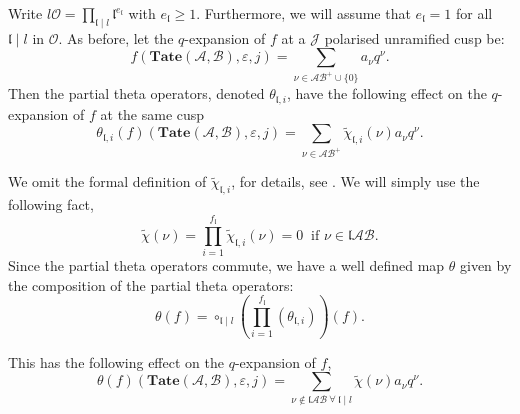 \documentclass[a4paper,oneside]{amsart}
\theoremstyle{plain}
\theoremstyle{definition}
\begin{document}
Write $l\mathcal{O}=\prod_{\mathfrak{l}\mid l} \mathfrak{l}^{e_{\mathfrak{l}}}$ with $e_\mathfrak{l} \geq 1$. Furthermore, we will assume that $e_\mathfrak{l}=1$ for all $\mathfrak{l} \mid l$ in $\mathcal{O}$. As before, let the $q$-expansion of $f$ at a $\mathcal{J}$ polarised unramified cusp be:
\begin{equation*}
    f(\textbf{Tate}(\mathcal{A}, \mathcal{B}), \varepsilon, j) = \sum_{\nu \in \mathcal{AB}^+\cup \{0\}} a_\nu q^\nu.
\end{equation*}
Then the partial theta operators, denoted $\theta_{\mathfrak{l},i}$, have the following effect on the $q$-expansion of $f$ at the same cusp
\begin{equation*}
    \theta_{\mathfrak{l},i}(f)(\textbf{Tate}(\mathcal{A}, \mathcal{B}), \varepsilon, j) = \sum_{\nu \in \mathcal{AB}^+} \tilde{\chi}_{\mathfrak{l},i}(\nu) a_\nu q^\nu.
\end{equation*}

We omit the formal definition of $\tilde{\chi}_{\mathfrak{l},i}$, for details, see \cite[\S 15]{andreattagoren}. We will simply use the following fact, 
\begin{equation*}
     \tilde{\chi}(\nu)=\prod_{i=1}^{f_{\mathfrak{l}}} \tilde{\chi}_{\mathfrak{l},i}(\nu) =  0 \ \text{ if } \nu \in \mathfrak{l}\mathcal{AB}.
\end{equation*}
Since the partial theta operators commute, we have a well defined map $\theta$ given by the composition of the partial theta operators:
\begin{equation} \label{eq:theta}
    \theta(f) = \circ_{\mathfrak{l} \mid l} \left(\prod_{i=1}^{f_\mathfrak{l}}  (\theta_{\mathfrak{l},i})\right)(f).
\end{equation}

This has the following effect on the $q$-expansion of $f$,
\begin{equation*}
    \theta(f)(\textbf{Tate}(\mathcal{A}, \mathcal{B}), \varepsilon, j) = \sum_{\nu \notin \mathfrak{l}\mathcal{AB} \ \forall \ \mathfrak{l} \mid l} \tilde{\chi}(\nu) a_\nu q^\nu.
\end{equation*}
\end{document}
